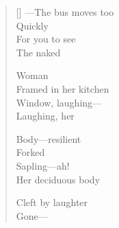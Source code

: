 \label{ch:there}
\settowidth{\versewidth}{               —The bus moves too}
\begin{verse}[\versewidth]
               ---The bus moves too\\
Quickly\\
For you to see\\
The naked

Woman\\
Framed in her kitchen\\
Window, laughing---\\
Laughing, her

Body---resilient\\
Forked\\
Sapling---ah!\\
Her deciduous body

Cleft by laughter\\
Gone---
\end{verse}

